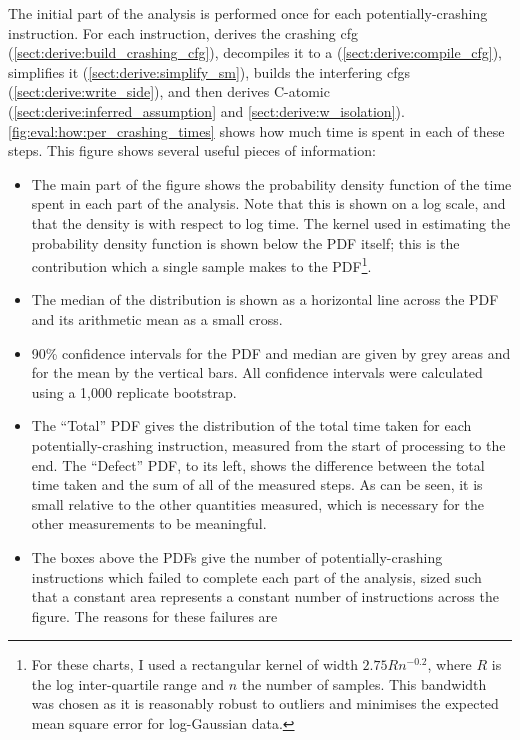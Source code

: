 \noindent
The initial part of the analysis is performed once for each
potentially-crashing instruction.  For each instruction, {\technique}
derives the crashing \gls{cfg}
(\autoref{sect:derive:build_crashing_cfg}), decompiles it to a
{\StateMachine} (\autoref{sect:derive:compile_cfg}), simplifies it
(\autoref{sect:derive:simplify_sm}), builds the interfering
\glspl{cfg} (\autoref{sect:derive:write_side}), and then derives
C-atomic (\autoref{sect:derive:inferred_assumption} and
\autoref{sect:derive:w_isolation}).
\autoref{fig:eval:how:per_crashing_times} shows how much time is spent
in each of these steps.  This figure shows several useful pieces of
information:
\begin{itemize}
\item The main part of the figure shows the probability density
  function of the time spent in each part of the analysis.  Note that
  this is shown on a log scale, and that the density is with respect
  to log time.  The kernel used in estimating the probability density
  function is shown below the PDF itself; this is the contribution
  which a single sample makes to the PDF\footnote{For these charts, I
    used a rectangular kernel of width $2.75Rn^{-0.2}$, where $R$ is
    the log inter-quartile range and $n$ the number of samples.  This
    bandwidth was chosen as it is reasonably robust to outliers and
    minimises the expected mean square error for log-Gaussian
    data.}\!\!.
\item The median of the distribution is shown as a horizontal line
  across the PDF and its arithmetic mean as a small cross.
\item 90\% confidence intervals for the PDF and median are given by
  grey areas and for the mean by the vertical bars.  All confidence
  intervals were calculated using a 1,000 replicate bootstrap.
\item The ``Total'' PDF gives the distribution of the total time taken
  for each potentially-crashing instruction, measured from the start
  of processing to the end.  The ``Defect'' PDF, to its left, shows
  the difference between the total time taken and the sum of all of
  the measured steps.  As can be seen, it is small relative to the
  other quantities measured, which is necessary for the other
  measurements to be meaningful.
\item The boxes above the PDFs give the number of potentially-crashing
  instructions which failed to complete each part of the analysis,
  sized such that a constant area represents a constant number of
  instructions across the figure.  The reasons for these failures are

\end{itemize}
